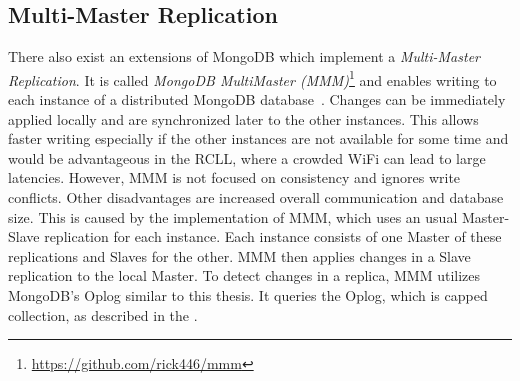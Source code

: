 \subsection{Multi-Master Replication}
\label{sec:mongodb-multi-master}
There also exist an extensions of MongoDB which implement a
\emph{Multi-Master Replication}. It is called \emph{MongoDB
  MultiMaster (MMM)}\footnote{\url{https://github.com/rick446/mmm}}
and enables writing to each instance of a distributed MongoDB
database~\cite{mongodb-multi-master}. Changes can be immediately
applied locally and are synchronized later to the other
instances. This allows faster writing especially if the other
instances are not available for some time and would be advantageous in
the RCLL, where a crowded WiFi can lead to large latencies. However,
MMM is not focused on consistency and ignores write conflicts. Other
disadvantages are increased overall communication and database
size. This is caused by the implementation of MMM, which uses an usual
Master-Slave replication for each instance. Each instance consists of
one Master of these replications and Slaves for the other. MMM then
applies changes in a Slave replication to the local Master.  To detect
changes in a replica, MMM utilizes MongoDB's Oplog similar to this
thesis. It queries the Oplog, which is capped collection, as described
in the .
